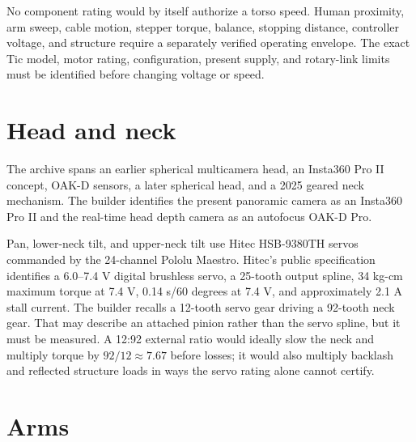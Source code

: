 \documentclass[10pt,openany]{book}
\begin{document}
\begin{safetybox}
No component rating would by itself authorize a torso speed. Human proximity, arm sweep, cable motion, stepper torque, balance, stopping distance, controller voltage, and structure require a separately verified operating envelope. The exact Tic model, motor rating, configuration, present supply, and rotary-link limits must be identified before changing voltage or speed.
\end{safetybox}


\section{Head and neck}

The archive spans an earlier spherical multicamera head, an Insta360 Pro II concept, OAK-D sensors, a later spherical head, and a 2025 geared neck mechanism. The builder identifies the present panoramic camera as an Insta360 Pro II and the real-time head depth camera as an autofocus OAK-D Pro.

Pan, lower-neck tilt, and upper-neck tilt use Hitec HSB-9380TH servos commanded by the 24-channel Pololu Maestro. Hitec's public specification identifies a 6.0--7.4 V digital brushless servo, a 25-tooth output spline, 34 kg-cm maximum torque at 7.4 V, 0.14 s/60 degrees at 7.4 V, and approximately 2.1 A stall current. The builder recalls a 12-tooth servo gear driving a 92-tooth neck gear. That may describe an attached pinion rather than the servo spline, but it must be measured. A 12:92 external ratio would ideally slow the neck and multiply torque by $92/12\approx7.67$ before losses; it would also multiply backlash and reflected structure loads in ways the servo rating alone cannot certify.


\section{Arms}
\end{document}

